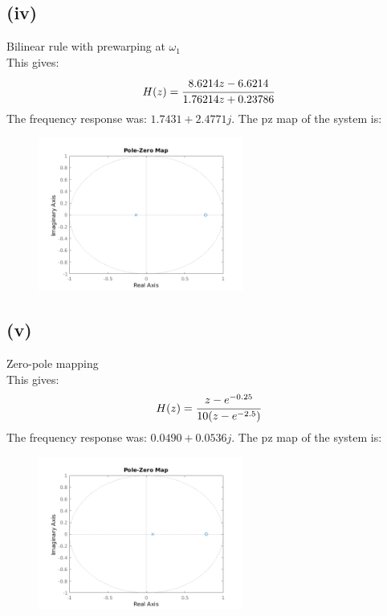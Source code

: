 \documentclass{article}
\begin{document}
\subsection*{(iv)}
Bilinear rule with prewarping at $\omega_1$\\
This gives:
\[H(z)=\cfrac{8.6214z-6.6214}{1.76214z+0.23786}\]
The frequency response was: $1.7431+2.4771j$. The pz map of the system is:
\begin{figure}[H]
    \centering
    \includegraphics[width=0.6\textwidth]{PR3_4.png}
\end{figure}
\subsection*{(v)}
Zero-pole mapping\\
This gives:
\[H(z)=\cfrac{z-e^{-0.25}}{10(z-e^{-2.5})}\]
The frequency response was: $0.0490+0.0536j$. The pz map of the system is:
\begin{figure}[H]
    \centering
    \includegraphics[width=0.6\textwidth]{PR3_5.png}
\end{figure}
\end{document}
